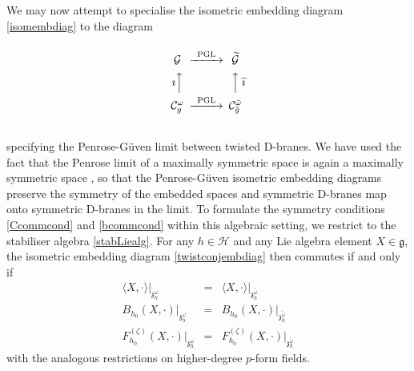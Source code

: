 We may now attempt to specialise the isometric embedding diagram
\eqref{isomembdiag} to the diagram
\begin{equation}
  \label{twistconjembdiag}
  \begin{CD}
   @.\\
    \mathcal{G} @>\text{PGL}>>                      \widetilde{\mathcal{G}}\\
    \text{$\imath$}@AAA @AAA\text{$\widetilde{\imath}$}\\
    \mathcal{C}_g^\omega @>\text{PGL}>> \mathcal{C}_{\tilde g}^{\tilde\omega}\\
   @.
  \end{CD}
\end{equation}
specifying the Penrose-G\"uven limit between twisted D-branes. We have used the
fact that the Penrose limit of a maximally symmetric space is again a maximally
symmetric space \cite{BFP1}, so that the Penrose-G\"uven isometric embedding
diagrams preserve the symmetry of the embedded spaces and symmetric D-branes map
onto symmetric D-branes in the limit. To formulate the symmetry conditions
\eqref{Ccommcond} and \eqref{bcommcond} within this algebraic setting, we
restrict to the stabiliser algebra \eqref{stabLiealg}. For any $h\in\mathcal{H}$
and any Lie algebra element $X\in\mathfrak{g}$, the isometric embedding diagram
\eqref{twistconjembdiag} then commutes if and only if
\begin{eqnarray}
  \label{innprodtwistcomm}
  \langle X,\cdot\rangle|_{\mathfrak{z}_h^\omega}&=&
  \langle X,\cdot\rangle|_{\mathfrak{z}_h^{\tilde\omega}}\\
  \label{Bfieldtwistcomm}
  B_{h_0}(X,\cdot)|_{\mathfrak{z}_h^\omega}&=&
  B_{h_0}(X,\cdot)|_{\mathfrak{z}_h^{\tilde\omega}}\\
  \label{Ftwistcomm}
  F^{(\zeta)}_{h_0}(X,\cdot)|_{\mathfrak{z}_h^\omega}
  &=&F^{(\zeta)}_{h_0}(X,\cdot)|_{\mathfrak{z}_h^{\tilde\omega}}
\end{eqnarray}
with the analogous restrictions on higher-degree $p$-form fields.

